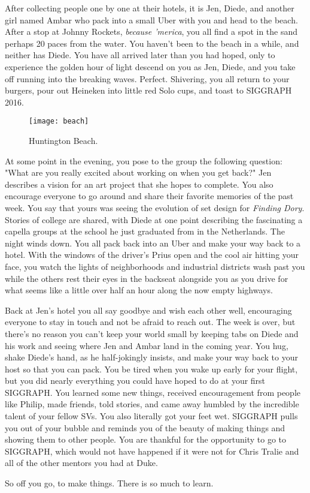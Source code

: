 \documentclass[../main.tex]{subfiles}
\begin{document}
After collecting people one by one at their hotels, it is Jen, Diede, and another girl named Ambar who pack into a small Uber with you and head to the beach. After a stop at Johnny Rockets, \textit{because 'merica}, you all find a spot in the sand perhaps 20 paces from the water. You haven't been to the beach in a while, and neither has Diede. You have all arrived later than you had hoped, only to experience the golden hour of light descend on you as Jen, Diede, and you take off running into the breaking waves. Perfect. Shivering, you all return to your burgers, pour out Heineken into little red Solo cups, and toast to SIGGRAPH 2016.

\begin{figure}[h!]
	\centering
	\texttt{[image: beach]}
	\caption*{Huntington Beach.}
\end{figure}

At some point in the evening, you pose to the group the following question: "What are you really excited about working on when you get back?" Jen describes a vision for an art project that she hopes to complete. You also encourage everyone to go around and share their favorite memories of the past week. You say that yours was seeing the evolution of set design for \textit{Finding Dory}. Stories of college are shared, with Diede at one point describing the fascinating a capella groups at the school he just graduated from in the Netherlands. The night winds down. You all pack back into an Uber and make your way back to a hotel. With the windows of the driver's Prius open and the cool air hitting your face, you watch the lights of neighborhoods and industrial districts wash past you while the others rest their eyes in the backseat alongside you as you drive for what seems like a little over half an hour along the now empty highways.

Back at Jen's hotel you all say goodbye and wish each other well, encouraging everyone to stay in touch and not be afraid to reach out. The week is over, but there's no reason you can't keep your world small by keeping tabs on Diede and his work and seeing where Jen and Ambar land in the coming year. You hug, shake Diede's hand, as he half-jokingly insists, and make your way back to your host so that you can pack. You be tired when you wake up early for your flight,  but you did nearly everything you could have hoped to do at your first SIGGRAPH. You learned some new things, received encouragement from people like Philip, made friends, told stories, and came away humbled by the incredible talent of your fellow SVs. You also literally got your feet wet. SIGGRAPH pulls you out of your bubble and reminds you of the beauty of making things and showing them to other people.  You are thankful for the opportunity to go to SIGGRAPH, which would not have happened if it were not for Chris Tralie and all of the other mentors you had at Duke.

\bigskip

So off you go, to make things. There is so much to learn.
\end{document}
